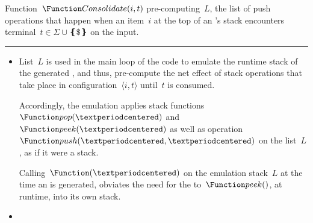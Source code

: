 \begin{algorithm}[htb]
  \caption{\label{algorithm:consolidate}
    Function~$\Function Consolidate(i,t)$ pre-computing~$L$, the list of push
    operations that happen when an item~$i$ at the top of an \RLLp's stack
    encounters terminal~$t∈Σ∪❴\$❵$ on the input.
  }
  \begin{algorithmic}
     
     
       
       
        \ENDWHILE
         
         
         
      \FI
       
    \ENDWHILE
     
     
  \end{algorithmic}
  \vspace{0.3ex}
  \hrule
  \vspace{0.3ex}
  \scriptsize
  \begin{itemize}
    \item List~$L$ is used in the main loop of the code to emulate the
          runtime stack of the generated \RLLp, and thus, pre-compute the net effect
          of stack operations that take place in
          configuration~$⟨i,t⟩$ until~$t$ is consumed.
          \par
          Accordingly, the emulation applies stack
          functions~$\Function pop(·)$ and~$\Function peek(·)$
          as well as operation~$\Function push(·,·)$ on the list~$L$,
          as if it were a stack.
          \par
          Calling~$\Function (·)$ on the emulation stack~$L$ at the time an
          \RLLp is generated, obviates the need for the \RLLp to~$\Function
          peek()$, at runtime, into its own stack.
    \item

\end{itemize}
\end{algorithm}
